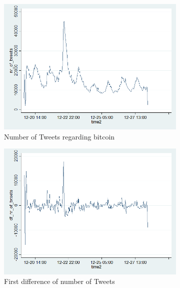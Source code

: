 \documentclass[a4paper,american,12pt]{article}
\begin{document}
\begin{spacing}{1.2}
\begin{figure}[H]
	\begin{subfigure}{.3\textwidth}
	\centering
	\includegraphics[width=1.12\textwidth]{stata_export_graphs/graph_plot_nr_tweets.png}
	\caption{Number of Tweets regarding bitcoin}
	\end{subfigure}\hfill
	\begin{subfigure}{.3\textwidth}
	\centering
	\includegraphics[width=1.12\textwidth]{stata_export_graphs/graph_plot_df_nr_tweets.png}
	\caption{First difference of number of Tweets}
	\end{subfigure}\hfill
	\begin{subfigure}{.3\textwidth}
	\centering

\end{subfigure}
\end{figure}
\end{spacing}
\end{document}
